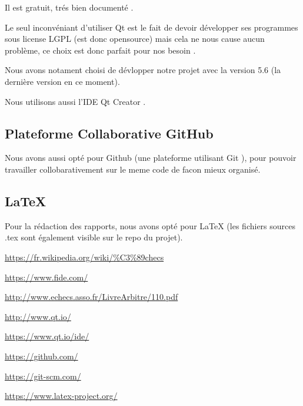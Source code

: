 \documentclass{article}
\begin{document}
Il est gratuit, trés bien documenté .

Le seul inconvéniant d'utiliser Qt est le fait de devoir développer ses programmes sous license LGPL (est donc opensource) mais cela ne nous cause aucun problème, ce choix est donc parfait pour nos besoin .

Nous avons notament choisi de dévlopper notre projet avec la version 5.6 (la dernière version en ce moment).

Nous utilisons aussi l'IDE Qt Creator \cite{qtcreator}.

\subsection{Plateforme Collaborative GitHub}

Nous avons aussi opté pour Github \cite{github} (une plateforme utilisant Git \cite{git} ), pour pouvoir travailler collobarativement sur le meme code de facon mieux organisé.

\subsection{LaTeX}

Pour la rédaction des rapports, nous avons opté pour LaTeX \cite{latex} (les fichiers sources .tex sont également visible sur le repo du projet).

\newpage

\begin{thebibliography}{9}

\url{https://fr.wikipedia.org/wiki/%C3%89checs}

\url{https://www.fide.com/}

\url{http://www.echecs.asso.fr/LivreArbitre/110.pdf}

\url{http://www.qt.io/}

\url{https://www.qt.io/ide/}

\url{https://github.com/}

\url{https://git-scm.com/}

\url{https://www.latex-project.org/}

\end{thebibliography}
\end{document}
